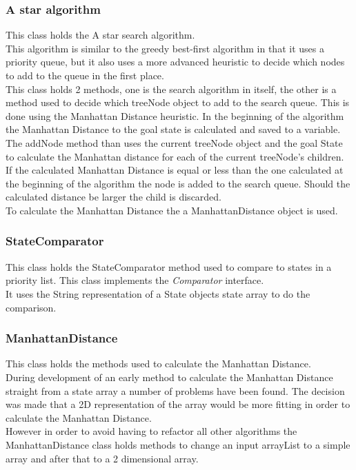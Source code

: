 \documentclass[journal]{IEEEtran}
\begin{document}
\subsubsection{A star algorithm}
This class holds the A star search algorithm.\\
This algorithm is similar to the greedy best-first algorithm in that it uses a priority queue, but it also uses a more advanced heuristic to decide which nodes to add to the queue in the first place. \\
This class holds 2 methods, one is the search algorithm in itself, the other is a method used to decide which treeNode object to add to the search queue. This is done using the Manhattan Distance heuristic. In the beginning of the algorithm the Manhattan Distance to the goal state is calculated and saved to a variable. \\
The addNode method than uses the current treeNode object and the goal State to calculate the Manhattan distance for each of the current treeNode's children. If the calculated Manhattan Distance is equal or less than the one calculated at the beginning of the algorithm the node is added to the search queue. Should the calculated distance be larger the child is discarded. \\
To calculate the Manhattan Distance the a ManhattanDistance object is used. \\

\subsubsection{StateComparator}
This class holds the StateComparator method used to compare to states in a priority list. This class implements the \textit{Comparator} interface. \\
It uses the String representation of a State objects state array to do the comparison. \\

\subsubsection{ManhattanDistance}
This class holds the methods used to calculate the Manhattan Distance. \\
During development of an early method to calculate the Manhattan Distance straight from a state array a number of problems have been found. The decision was made that a 2D representation of the array would be more fitting in order to calculate the Manhattan Distance. \\
However in order to avoid having to refactor all other algorithms the ManhattanDistance class holds methods to change an input arrayList to a simple array and after that to a 2 dimensional array. \\
\end{document}
